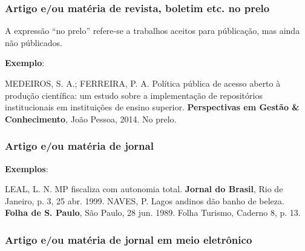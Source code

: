 \subsubsection{Artigo e/ou matéria de revista, boletim etc. no prelo}

A expressão ``no prelo'' refere-se a trabalhos aceitos para públicação, mas ainda não públicados.

\begin{exemplomanual}
\textbf{Exemplo}:\\
\begin{singlespace}
MEDEIROS, S. A.; FERREIRA, P. A. Política pública de acesso aberto à produção científica: um estudo sobre a implementação de repositórios institucionais em instituições de ensino superior. \textbf{Perspectivas em Gestão \& Conhecimento}, João Pessoa, 2014. No prelo.
\end{singlespace}
\end{exemplomanual}


\subsubsection{Artigo e/ou matéria de jornal}

\begin{flushleft}
\begin{singlespace}
\end{singlespace}
\end{flushleft}

\begin{exemplomanual}
\textbf{Exemplos}:\\
\begin{singlespace}
LEAL, L. N. MP fiscaliza com autonomia total. \textbf{Jornal do Brasil}, Rio de Janeiro, p. 3, 25 abr. 1999.
\newline
\newline
NAVES, P. Lagos andinos dão banho de beleza. \textbf{Folha de S. Paulo}, São Paulo, 28 jun. 1989. Folha Turismo, Caderno 8, p. 13.
\end{singlespace}
\end{exemplomanual}


\subsubsection{Artigo e/ou matéria de jornal em meio eletrônico}

